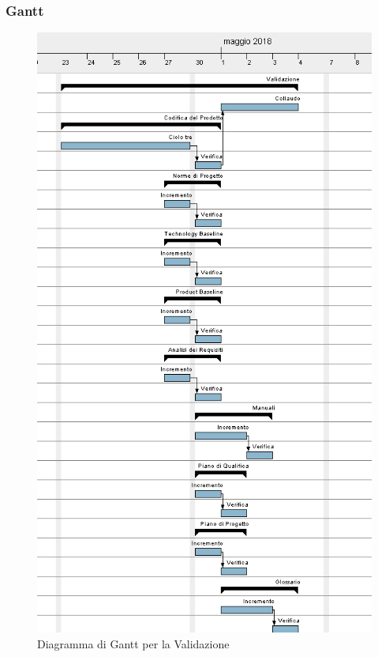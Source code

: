 \subsubsection{Gantt}
\begin{figure}[h!]
	\centering 
	\includegraphics[width=1\textwidth]{images/Validazione.png}
	\caption{Diagramma di Gantt per la Validazione}
	\label{graficobello6} 
\end{figure}
